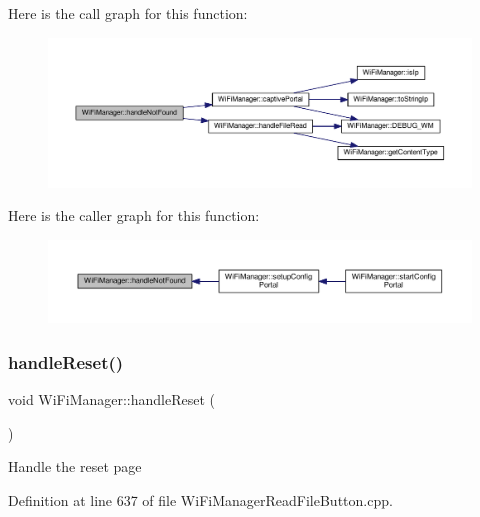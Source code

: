 Here is the call graph for this function\+:\nopagebreak
\begin{figure}[H]
\begin{center}
\leavevmode
\includegraphics[width=350pt]{d4/dc8/class_wi_fi_manager_a7d01f7de3e4b76acdabffac79fa3d0ab_cgraph}
\end{center}
\end{figure}
Here is the caller graph for this function\+:\nopagebreak
\begin{figure}[H]
\begin{center}
\leavevmode
\includegraphics[width=350pt]{d4/dc8/class_wi_fi_manager_a7d01f7de3e4b76acdabffac79fa3d0ab_icgraph}
\end{center}
\end{figure}
\mbox{\label{class_wi_fi_manager_a94fb1a8fcfbd0d02714c69138bf72f9c}} 
\subsubsection{\texorpdfstring{handle\+Reset()}{handleReset()}}
{\footnotesize\ttfamily void Wi\+Fi\+Manager\+::handle\+Reset (\begin{DoxyParamCaption}{ }\end{DoxyParamCaption})\hspace{0.3cm}{\ttfamily [private]}}

Handle the reset page 

Definition at line 637 of file Wi\+Fi\+Manager\+Read\+File\+Button.\+cpp.


